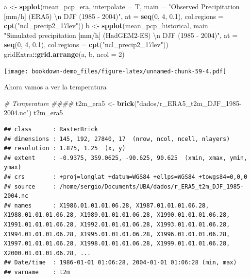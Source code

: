 \documentclass[]{book}
\newenvironment{Shaded}{\begin{snugshade}}{\end{snugshade}}
\newcommand{\CharTok}[1]{\textcolor[rgb]{0.31,0.60,0.02}{#1}}
\newcommand{\CommentTok}[1]{\textcolor[rgb]{0.56,0.35,0.01}{\textit{#1}}}
\newcommand{\DataTypeTok}[1]{\textcolor[rgb]{0.13,0.29,0.53}{#1}}
\newcommand{\DecValTok}[1]{\textcolor[rgb]{0.00,0.00,0.81}{#1}}
\newcommand{\FloatTok}[1]{\textcolor[rgb]{0.00,0.00,0.81}{#1}}
\newcommand{\KeywordTok}[1]{\textcolor[rgb]{0.13,0.29,0.53}{\textbf{#1}}}
\newcommand{\NormalTok}[1]{#1}
\newcommand{\OperatorTok}[1]{\textcolor[rgb]{0.81,0.36,0.00}{\textbf{#1}}}
\newcommand{\StringTok}[1]{\textcolor[rgb]{0.31,0.60,0.02}{#1}}
\begin{document}
\begin{Shaded}
\begin{Highlighting}[]
\NormalTok{a <-}\StringTok{ }\KeywordTok{spplot}\NormalTok{(mean_pcp_era, }\DataTypeTok{interpolate =}\NormalTok{ T,}
            \DataTypeTok{main =} \StringTok{"Observed Precipitation [mm/h] (ERA5) }\CharTok{\textbackslash{}n}\StringTok{ DJF (1985 - 2004)"}\NormalTok{,}
            \DataTypeTok{at =} \KeywordTok{seq}\NormalTok{(}\DecValTok{0}\NormalTok{, }\DecValTok{4}\NormalTok{, }\FloatTok{0.1}\NormalTok{),}
            \DataTypeTok{col.regions =} \KeywordTok{cpt}\NormalTok{(}\StringTok{"ncl_precip2_17lev"}\NormalTok{))}
\NormalTok{b <-}\StringTok{ }\KeywordTok{spplot}\NormalTok{(mean_pcp_historical,}
            \DataTypeTok{main =} \StringTok{"Simulated precipitation [mm/h] (HadGEM2-ES) }\CharTok{\textbackslash{}n}\StringTok{ DJF (1985 - 2004)"}\NormalTok{,}
            \DataTypeTok{at =} \KeywordTok{seq}\NormalTok{(}\DecValTok{0}\NormalTok{, }\DecValTok{4}\NormalTok{, }\FloatTok{0.1}\NormalTok{),}
            \DataTypeTok{col.regions =} \KeywordTok{cpt}\NormalTok{(}\StringTok{"ncl_precip2_17lev"}\NormalTok{))}
\NormalTok{gridExtra}\OperatorTok{::}\KeywordTok{grid.arrange}\NormalTok{(a, b, }\DataTypeTok{ncol =} \DecValTok{2}\NormalTok{)}
\end{Highlighting}
\end{Shaded}

\texttt{[image: bookdown-demo\_files/figure-latex/unnamed-chunk-59-4.pdf]}

Ahora vamos a ver la temperatura

\begin{Shaded}
\begin{Highlighting}[]
\CommentTok{# Temperature ####}
\NormalTok{t2m_era5 <-}\StringTok{ }\KeywordTok{brick}\NormalTok{(}\StringTok{"dados/r_ERA5_t2m_DJF_1985-2004.nc"}\NormalTok{)}
\NormalTok{t2m_era5}
\end{Highlighting}
\end{Shaded}

\begin{verbatim}
## class      : RasterBrick 
## dimensions : 145, 192, 27840, 17  (nrow, ncol, ncell, nlayers)
## resolution : 1.875, 1.25  (x, y)
## extent     : -0.9375, 359.0625, -90.625, 90.625  (xmin, xmax, ymin, ymax)
## crs        : +proj=longlat +datum=WGS84 +ellps=WGS84 +towgs84=0,0,0 
## source     : /home/sergio/Documents/UBA/dados/r_ERA5_t2m_DJF_1985-2004.nc 
## names      : X1986.01.01.01.06.28, X1987.01.01.01.06.28, X1988.01.01.01.06.28, X1989.01.01.01.06.28, X1990.01.01.01.06.28, X1991.01.01.01.06.28, X1992.01.01.01.06.28, X1993.01.01.01.06.28, X1994.01.01.01.06.28, X1995.01.01.01.06.28, X1996.01.01.01.06.28, X1997.01.01.01.06.28, X1998.01.01.01.06.28, X1999.01.01.01.06.28, X2000.01.01.01.06.28, ... 
## Date/time  : 1986-01-01 01:06:28, 2004-01-01 01:06:28 (min, max)
## varname    : t2m
\end{verbatim}
\end{document}
